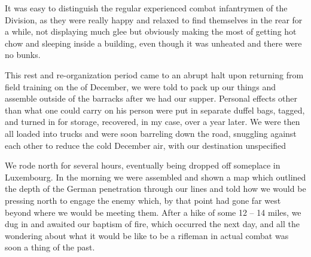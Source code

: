 \documentclass[../m3y]{subfiles}
\begin{document}
It was easy to distinguish the regular experienced combat infantrymen of the  Division, as they were really happy and relaxed to find themselves in the rear for a while, not displaying much glee but obviously making the most of getting hot chow and sleeping inside a building, even though it was unheated and there were no bunks.

This rest and re-organization period came to an abrupt halt upon returning from field training on the  of December, we were told to pack up our things and assemble outside of the barracks after we had our supper. Personal effects other than what one could carry on his person were put in separate duffel bags, tagged, and turned in for storage, recovered, in my case, over a year later. We were then all loaded into trucks and were soon barreling down the road, snuggling against each other to reduce the cold December air, with our destination unspecified

We rode north for several hours, eventually being dropped off someplace in Luxembourg. In the morning we were assembled and shown a map which outlined the depth of the German penetration through our lines and told how we would be pressing north to engage the enemy which, by that point had gone far west beyond where we would be meeting them. After a hike of some 12 -- 14 miles, we dug in and awaited our baptism of fire, which occurred the next day, and all the wondering about what it would be like to be a rifleman in actual combat was soon a thing of the past.
\end{document}
